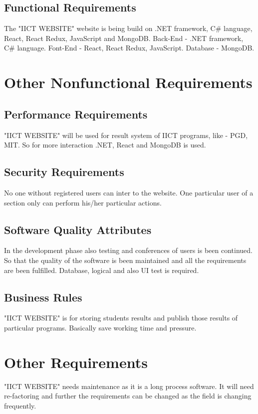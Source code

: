 \documentclass{scrreprt}
\begin{document}
\section{Functional Requirements}
The "IICT WEBSITE" website is being build on .NET framework, C\# language, React, React Redux, JavaScript and MongoDB.
\newline
Back-End - .NET framework, C\# language.
\newline
Font-End - React, React Redux, JavaScript.
\newline
Database -  MongoDB.


\chapter{Other Nonfunctional Requirements}

\section{Performance Requirements}
"IICT WEBSITE" will be used for result system of IICT programs, like - PGD, MIT. So for more interaction .NET, React and MongoDB is used. 

\section{Security Requirements}
No one without registered users can inter to the website. One particular user of a section only can perform his/her particular actions. 

\section{Software Quality Attributes}
In the development phase also testing and conferences of users is been continued. So that the quality of the software is been maintained and all the requirements are been fulfilled.
\newline
Database, logical and also UI test is required. 

\section{Business Rules}
"IICT WEBSITE" is for storing students results and publish those results of particular programs.
\newline
Basically save working time and pressure. 


\chapter{Other Requirements}
"IICT WEBSITE" needs maintenance as it is a long process software. It will need re-factoring and further the requirements can be changed as the field is changing frequently. 
\end{document}
